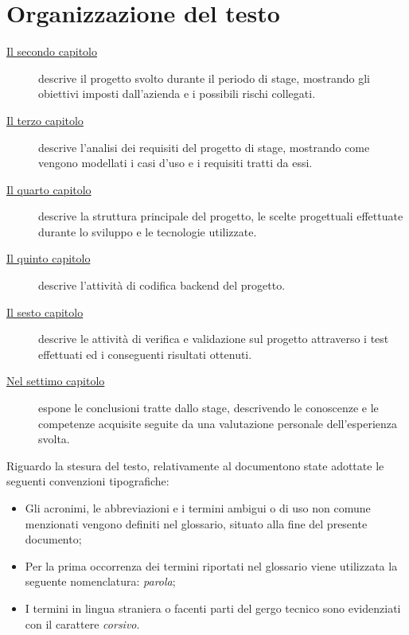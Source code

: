 \section{Organizzazione del testo}

\begin{description}
      \item[{\hyperref[cap:descrizione-stage]{Il secondo capitolo}}] descrive
            il progetto svolto durante il periodo di stage, mostrando gli
            obiettivi imposti dall'azienda e i possibili rischi collegati.

      \item[{\hyperref[cap:analisi-requisiti]{Il terzo capitolo}}] descrive
            l'analisi dei requisiti del progetto di stage, mostrando come vengono
            modellati i casi d'uso e i requisiti tratti da essi.

      \item[{\hyperref[cap:struttura-progettazione]{Il quarto capitolo}}] descrive
            la struttura principale del progetto, le scelte progettuali effettuate
            durante lo sviluppo e le tecnologie utilizzate.

      \item[{\hyperref[cap:codifica]{Il quinto capitolo}}] descrive l'attività di
            codifica backend del progetto.

      \item[{\hyperref[cap:verifica-validazione]{Il sesto capitolo}}] descrive le
            attività di verifica e validazione sul progetto attraverso i test effettuati
            ed i conseguenti risultati ottenuti.

      \item[{\hyperref[cap:conclusioni]{Nel settimo capitolo}}] espone le
            conclusioni tratte dallo stage, descrivendo le conoscenze e le competenze
            acquisite seguite da una valutazione personale dell'esperienza svolta.
\end{description}

Riguardo la stesura del testo, relativamente al documentono state adottate le seguenti convenzioni tipografiche:
\begin{itemize}
      \item Gli acronimi, le abbreviazioni e i termini ambigui o di uso non comune menzionati vengono definiti nel glossario, situato alla fine del presente documento;
      \item Per la prima occorrenza dei termini riportati nel glossario viene utilizzata la seguente nomenclatura: \glsfirstoccur\emph{parola};
      \item I termini in lingua straniera o facenti parti del gergo tecnico sono evidenziati con il carattere \emph{corsivo}.
\end{itemize}
